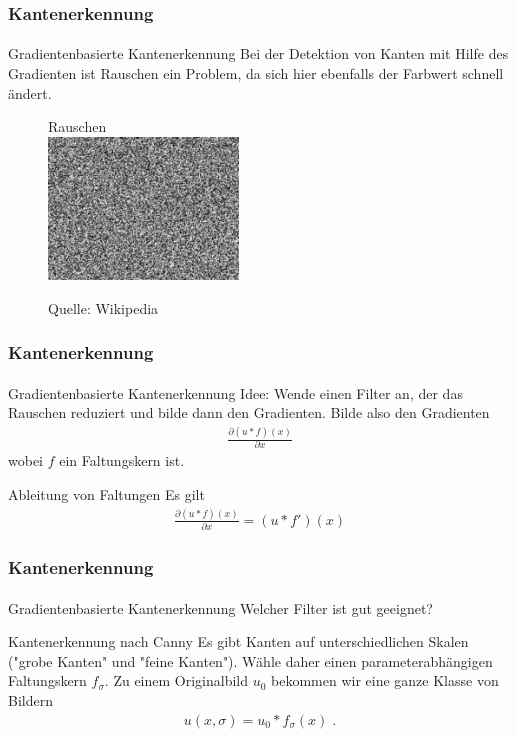 \documentclass{beamer}
\begin{document}
\begin{frame}
    \frametitle{Kantenerkennung}
\framesubtitle{}
\begin{block}{Gradientenbasierte Kantenerkennung}
Bei der Detektion von Kanten mit Hilfe des Gradienten ist   Rauschen ein Problem, da sich  hier ebenfalls  der Farbwert schnell ändert. 
\end{block}
\begin{figure}[htp]
      \centering
Rauschen \\
    \includegraphics[width=0.45\textwidth]{img/noise} 
      \caption{Quelle: Wikipedia}
\end{figure}

 \end{frame}

\begin{frame}
    \frametitle{Kantenerkennung}
\framesubtitle{}
\begin{block}{Gradientenbasierte Kantenerkennung}
Idee: Wende einen Filter an, der das Rauschen reduziert und bilde dann den Gradienten. Bilde also den Gradienten
\begin{align*}
\frac{\partial (u * f)(x)}{\partial x} 
\end{align*}
wobei $f$ ein Faltungskern ist.
\end{block}

\begin{block}{Ableitung von Faltungen}
Es gilt
\begin{align*}
\frac{\partial (u * f)(x)}{\partial x} = (u * f')(x)
\end{align*}

\end{block}

 \end{frame}


\begin{frame}
    \frametitle{Kantenerkennung}
\framesubtitle{}
\begin{block}{Gradientenbasierte Kantenerkennung}
Welcher Filter ist gut geeignet?
\end{block}
\begin{block}{Kantenerkennung nach Canny}
Es gibt Kanten auf unterschiedlichen Skalen ("grobe Kanten" und "feine Kanten"). Wähle daher einen parameterabhängigen Faltungskern
$f_\sigma$. Zu einem Originalbild $u_0$ bekommen wir eine ganze Klasse von Bildern
\begin{align*}
u(x, \sigma) = u_0 * f_\sigma(x) \;.
\end{align*}
 \end{block}

 \end{frame}
\end{document}
